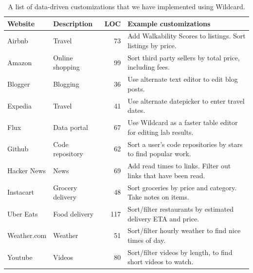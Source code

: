 \documentclass[sigplan,screen,10pt,anonymous,review]{acmart}
\begin{document}
\begin{table}[]
\begin{tabular}{llrl}
\hline
\textbf{Website} & \textbf{Description} & \textbf{LOC} & \textbf{Example customizations}                                                              \\ \hline
Airbnb           & Travel               & 73                                       & Add Walkability Scores to listings. Sort listings by price.                           \\
Amazon           & Online shopping      & 99                                       & Sort third party sellers by total price, including fees.                                \\
Blogger          & Blogging             & 36                                       & Use alternate text editor to edit blog posts.                                                 \\
Expedia          & Travel               & 41                                       & Use alternate datepicker to enter travel dates.                                               \\
Flux             & Data portal          & 67                                       & Use Wildcard as a faster table editor for editing lab results.                                \\
Github           & Code repository      & 62                                       & Sort a user's code repositories by stars to find popular work.                                \\
Hacker News      & News                 & 69                                       & Add read times to links. Filter out links that have been read. \\
Instacart        & Grocery delivery     & 48                                       & Sort groceries by price and category. Take notes on items.                                   \\
Uber Eats        & Food delivery        & 117                                      & Sort/filter restaurants by estimated delivery ETA and price.                                 \\
Weather.com  & Weather              & 51                                       & Sort/filter hourly weather to find nice times of day.                                        \\
Youtube          & Videos               & 80                                       & Sort/filter videos by length, to find short videos to watch.                                 \\ \hline
\end{tabular}
\caption{A list of data-driven customizations that we have implemented using Wildcard.}
\label{tab:websites}
\end{table}
\end{document}
